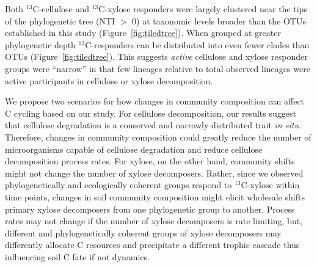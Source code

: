 Both $^{13}$C-cellulose and $^{13}$C-xylose responders were largely clustered
near the tips of the phylogenetic tree (NTI $>$ 0) at taxonomic levels broader
than the OTUs established in this study (Figure~\ref{fig:tiledtree}). When
grouped at greater phylogenetic depth $^{13}$C-responders can be distributed
into even fewer clades than OTUs (Figure~\ref{fig:tiledtree}). This suggests
\textit{active} cellulose and xylose responder groups were ``narrow'' in that
few lineages relative to total observed lineages were active participants in
cellulose or xylose decomposition. 

We propose two scenarios for how changes in community composition can affect
C cycling based on our study. For cellulose decomposition, our results suggest
that cellulose degradation is a conserved and narrowly distributed trait
\textit{in situ}. Therefore, changes in community composition could greatly
reduce the number of microorganisms capable of cellulose degradation and reduce
cellulose decomposition process rates. For xylose, on the other hand, community
shifts might not change the number of xylose decomposers. Rather, since we
observed phylogenetically and ecologically coherent groups respond to
$^{13}$C-xylose within time points, changes in soil community composition might
elicit wholesale shifts primary xylose decomposers from one phylogenetic group
to another. Process rates may not change if the number of xylose decomposers is
rate limiting, but, different and phylogenetically coherent groups of xylose
decomposers may differently allocate C resources and precipitate a different
trophic cascade thus influencing soil C fate if not dynamics. 

